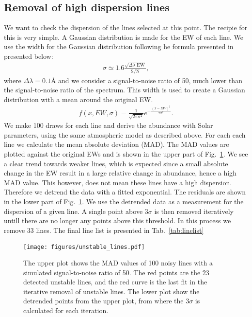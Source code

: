 \documentclass{aa}
\begin{document}
\subsection{Removal of high dispersion lines}
\label{sub:removal_of_unstable_lines}

We want to check the dispersion of the lines selected at this point. The
recipie for this is very simple. A Gaussian distribution is made for the
EW of each line. We use the width for the Gaussian distribution following
he formula presented in \citet{Caryel1988} presented below:
\begin{align}
    \sigma \simeq 1.6 \frac{\sqrt{\Delta\lambda\; \mathrm{EW}}}{\mathrm{S/N}},
\end{align}
where $\Delta\lambda=0.1\si{\angstrom}$ and we consider a
signal-to-noise ratio of 50, much lower than the signal-to-noise ratio
of the spectrum. This width is used to create a Gaussian distribution with
a mean around the original EW.
\begin{align}
    f(x, EW, \sigma) = \frac{1}{\sqrt{2\pi\sigma^2}} e^{-\frac{(x-EW)^2}{2\sigma^2}}.
\end{align}
We make 100 draws for each line and derive the abundance with Solar
parameters, using the same atmospheric model as described above. For
each each line we calculate the mean absolute deviation (MAD). The MAD
values are plotted against the original EWs and is shown in the upper part of
Fig.~\ref{fig:unstable_lines}. We see a clear trend towards weaker lines,
which is expected since a small absolute change in the EW result in a
large relative change in abundance, hence a high MAD value. This however,
does not mean these lines have a high dispersion. Therefore we detrend the data
with a fitted exponential. The residuals are shown in the lower part of
Fig.~\ref{fig:unstable_lines}. We use the detrended data as a measurement
for the dispersion of a given line. A single point above $3 \sigma$ is
then removed iteratively untill there are no longer any points above
this threshold. In this process we remove 33 lines. The final line list
is presented in Tab.~\ref{tab:linelist}

\begin{figure}[tbp!]
    \centering
    \texttt{[image: figures/unstable\_lines.pdf]}
    \caption{The upper plot shows the MAD values of 100 noisy lines with
    a simulated signal-to-noise ratio of 50. The red points are the 23
    detected unstable lines, and the red curve is the last fit in the
    iterative removal of unstable lines.
    The lower plot show the detrended points from the upper plot, from
    where the $3\sigma$ is calculated for each iteration.}
    \label{fig:unstable_lines}
\end{figure}
\end{document}

